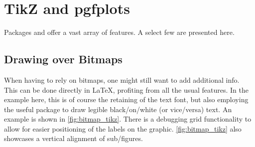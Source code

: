 \section{TikZ and pgfplots}
Packages  and  offer a vast array of features.
A select few are presented here.

\subsection{Drawing over Bitmaps}

When having to rely on bitmaps, one might still want to add additional info.
This can be done directly in \LaTeX{}, profiting from all the usual features.
In the example here, this is of course the retaining of the text font, but also
employing the useful  package to draw legible black\-/on\-/white
(or vice\-/versa) text.
An example is shown in \cref{fig:bitmap_tikz}.
There is a debugging grid functionality to allow for easier positioning of the labels
on the graphic.
\cref{fig:bitmap_tikz} also showcases a vertical alignment of sub\-/figures.

